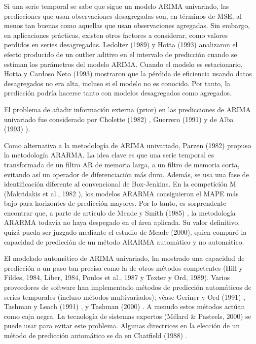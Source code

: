 \documentclass{llncs}
\begin{document}
Si una serie temporal se sabe que sigue un modelo ARIMA univariado, las predicciones que usan observaciones desagregadas son, en términos de MSE, al menos tan buenas como aquellas que usan observaciones agregadas. Sin embargo, en aplicaciones prácticas, existen otros factores a considerar, como valores perdidos en series desagregadas. Ledolter (1989) \cite{Ledolter1989231} y Hotta (1993) \cite{Hotta1993261} analizaron el efecto producido de un outlier aditivo en el intervalo de predicción cuando se estiman los parámetros del modelo ARIMA. Cuando el modelo es estacionario, Hotta y Cardoso Neto (1993) mostraron que la pérdida de eficiencia usando datos desagregados no era alta, incluso si el modelo no es conocido. Por tanto, la predicción podría hacerse tanto con modelos desagregados como agregados.

El problema de añadir información externa (prior) en las predicciones de ARIMA univariado fue considerado por Cholette (1982) \cite{Cholette1982375}, Guerrero (1991) \cite{Guerrero1991339} y de Alba (1993) \cite{deAlba199395}).

Como alternativa a la metodología de ARIMA univariado, Parzen (1982) \cite{Parzen198267} propuso la metodología ARARMA. La idea clave es que una serie temporal es transformada de un filtro AR de memoria larga, a un filtro de memoria corta, evitando así un operador de diferenciación más duro. Además, se usa una fase de identificación diferente al convencional de Box-Jenkins. En la competición M (Makridakis et al., 1982 \cite{Makridakis1982111}), los modelos ARARMA consiguieron el MAPE más bajo para horizontes de predicción mayores. Por lo tanto, es sorprendente encontrar que, a parte de artículo de Meade y Smith (1985) \cite{Meade1985519}, la metodología ARARMA todavía no haya despegado en el área aplicada. Su valor definitivo, quizá pueda ser juzgado mediante el estudio  de Meade (2000), quien comparó la capacidad de predicción de un método ARARMA automático y no automático.

El modelado automático de ARIMA univariado, ha mostrado una capacidad de predicción a un paso tan precisa como la de otros métodos competentes (Hill y Fildes, 1984, Liber, 1984, Poulos et al., 1987 y Texter y Ord, 1989). Varios proveedores de software han implementado métodos de predicción automáticos de series temporales (incluso métodos multivariados); véase Geriner y Ord (1991) \cite{Geriner1991127}, Tashman y Leach (1991) \cite{Tashman1991209}, y Tashman (2000) \cite{Tashman2000437}. A menudo estos métodos actúan como caja negra. La tecnología de sistemas expertos (Mélard \& Pasteels, 2000) se puede usar para evitar este problema. Algunas directrices en la elección de un método de predicción automático se da en Chatfield (1988) \cite{Chatfield198819}.
\end{document}
